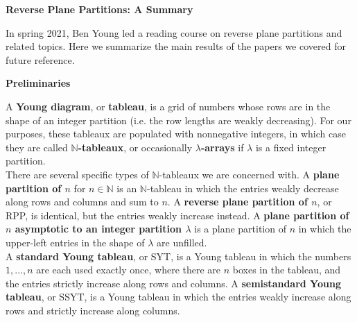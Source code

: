 



\vspace*{.25in}

\begin{center}
	\huge \textbf{Reverse Plane Partitions: A Summary}\\
\end{center}

\vspace{.25in}


In spring 2021, Ben Young led a reading course on reverse plane partitions and related topics. Here we summarize the main results of the papers we covered for future reference.\\



\vspace{.25in}

\Large \textbf{Preliminaries}\\

\normalsize

A \textbf{Young diagram}, or \textbf{tableau}, is a grid of numbers whose rows are in the shape of an integer partition (i.e. the row lengths are weakly decreasing). For our purposes, these tableaux are populated with nonnegative integers, in which case they are called \textbf{$\mathbb{N}$-tableaux}, or occasionally \textbf{$\lambda$-arrays} if $\lambda$ is a fixed integer partition.\\

There are several specific types of $\mathbb{N}$-tableaux we are concerned with. A \textbf{plane partition of $n$} for $n \in \mathbb{N}$ is an $\mathbb{N}$-tableau in which the entries weakly decrease along rows and columns and sum to $n$. A \textbf{reverse plane partition of $n$}, or RPP, is identical, but the entries weakly increase instead. A \textbf{plane partition of $n$ asymptotic to an integer partition $\lambda$} is a plane partition of $n$ in which the upper-left entries in the shape of $\lambda$ are unfilled.\\

A \textbf{standard Young tableau}, or SYT, is a Young tableau in which the numbers $1, ..., n$ are each used exactly once, where there are $n$ boxes in the tableau, and the entries strictly increase along rows and columns. A \textbf{semistandard Young tableau}, or SSYT, is a Young tableau in which the entries weakly increase along rows and strictly increase along columns.\\

